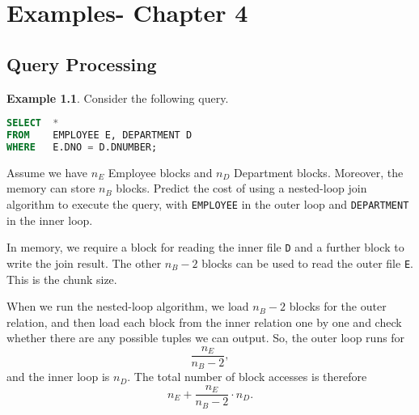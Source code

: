 \documentclass[a4paper, openany]{memoir}
\theoremstyle{definition}
\newtheorem{example}[subsection]{Example}
\begin{document}
\chapter{Examples- Chapter 4}
\section{Query Processing}
\begin{example}
    Consider the following query.
\begin{lstlisting}[language=SQL]
SELECT  *
FROM    EMPLOYEE E, DEPARTMENT D
WHERE   E.DNO = D.DNUMBER;
\end{lstlisting}
    Assume we have $n_E$ Employee blocks and $n_D$ Department blocks. Moreover, the memory can store $n_B$ blocks. Predict the cost of using a nested-loop join algorithm to execute the query, with \texttt{EMPLOYEE} in the outer loop and \texttt{DEPARTMENT} in the inner loop.
\end{example}
\begin{answer}
    In memory, we require a block for reading the inner file \texttt{D} and a further block to write the join result. The other $n_B - 2$ blocks can be used to read the outer file \texttt{E}. This is the chunk size.

    When we run the nested-loop algorithm, we load $n_B - 2$ blocks for the outer relation, and then load each block from the inner relation one by one and check whether there are any possible tuples we can output. So, the outer loop runs for
    \[\frac{n_E}{n_B - 2},\]
    and the inner loop is $n_D$. The total number of block accesses is therefore
    \[n_E + \frac{n_E}{n_B - 2} \cdot n_D.\]

\end{answer}
\end{document}
